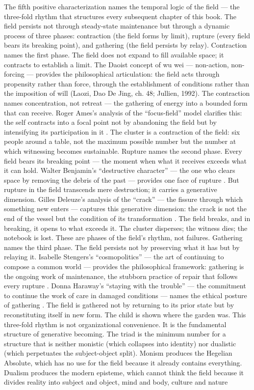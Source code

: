 The fifth positive characterization names the temporal logic of the field --- the three-fold rhythm that structures every subsequent chapter of this book. The field persists not through steady-state maintenance but through a dynamic process of three phases: contraction (the field forms by limit), rupture (every field bears its breaking point), and gathering (the field persists by relay). Contraction names the first phase. The field does not expand to fill available space; it contracts to establish a limit. The Daoist concept of wu wei — non-action, non-forcing — provides the philosophical articulation: the field acts through propensity rather than force, through the establishment of conditions rather than the imposition of will (Laozi, Dao De Jing, ch. 48; Jullien, 1992). The contraction names concentration, not retreat — the gathering of energy into a bounded form that can receive. Roger Ames’s analysis of the “focus-field” model clarifies this: the self contracts into a focal point not by abandoning the field but by intensifying its participation in it \cite{ames_2011}. The cluster is a contraction of the field: six people around a table, not the maximum possible number but the number at which witnessing becomes sustainable. Rupture names the second phase. Every field bears its breaking point — the moment when what it receives exceeds what it can hold. Walter Benjamin’s “destructive character” — the one who clears space by removing the debris of the past — provides one face of rupture \cite{benjamin_1931}. But rupture in the field transcends mere destruction; it carries a generative dimension. Gilles Deleuze’s analysis of the “crack” — the fissure through which something new enters — captures this generative dimension: the crack is not the end of the vessel but the condition of its transformation \cite{deleuze_1969}. The field breaks, and in breaking, it opens to what exceeds it. The cluster disperses; the witness dies; the notebook is lost. These are phases of the field’s rhythm, not failures. Gathering names the third phase. The field persists not by preserving what it has but by relaying it. Isabelle Stengers’s “cosmopolitics” — the art of continuing to compose a common world — provides the philosophical framework: gathering is the ongoing work of maintenance, the stubborn practice of repair that follows every rupture \cite{stengers_2010}. Donna Haraway’s “staying with the trouble” — the commitment to continue the work of care in damaged conditions — names the ethical posture of gathering \cite{haraway_2016}. The field is gathered not by returning to its prior state but by reconstituting itself in new form. The child is shown where the garden was. This three-fold rhythm is not organizational convenience. It is the fundamental structure of generative becoming. The triad is the minimum number for a structure that is neither monistic (which collapses into identity) nor dualistic (which perpetuates the subject-object split). Monism produces the Hegelian Absolute, which has no use for the field because it already contains everything. Dualism produces the modern episteme, which cannot think the field because it divides reality into subject and object, mind and body, culture and nature


